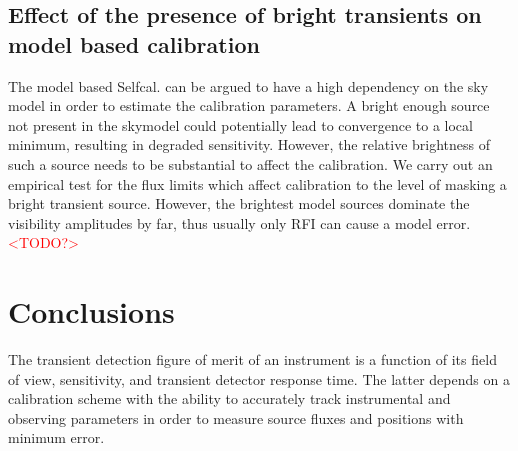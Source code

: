 \documentclass{aa}
\begin{document}
\subsection{Effect of the presence of bright transients on model based calibration}

The model  based Selfcal. can  be argued  to have a  high dependency on  the sky
model in  order to estimate the  calibration parameters. A  bright enough source
not present  in the skymodel  could potentially lead  to convergence to  a local
minimum, resulting in degraded sensitivity.  However, the relative brightness of
such a source needs to be substantial to affect the calibration. We carry out an
empirical test  for the  flux limits  which affect calibration  to the  level of
masking a bright transient source. However, the brightest model sources dominate
the  visibility amplitudes  by far,  thus  usually only  RFI can  cause a  model
error. \textcolor{red}{<TODO?>}


\section{Conclusions}

The transient  detection figure of merit of  an instrument is a  function of its
field of  view, sensitivity,  and transient detector  response time.  The latter
depends  on  a   calibration  scheme  with  the  ability   to  accurately  track
instrumental  and observing  parameters in  order to  measure source  fluxes and
positions with minimum error.
\end{document}
